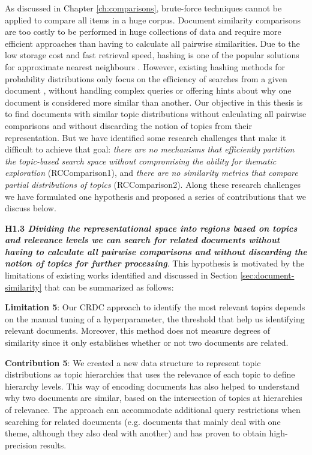 As discussed in Chapter \ref{ch:comparisons}, brute-force techniques cannot be applied to compare all items in a huge corpus. Document similarity comparisons are too costly to be performed in huge collections of data and require more efficient approaches than having to calculate all pairwise similarities. Due to the low storage cost and fast retrieval speed, hashing is one of the popular solutions for approximate nearest neighbours \citep{Zhen2016}. However, existing hashing methods for probability distributions only focus on the efficiency of searches from a given document \citep{Mao2017}, without handling complex queries or offering hints about why one document is considered more similar than another. Our objective in this thesis is to find documents with similar topic distributions without calculating all pairwise comparisons and without discarding the notion of topics from their representation. But we have identified some research challenges that make it difficult to achieve that goal: \textit{there are no mechanisms that efficiently partition the topic-based search space without compromising the ability for thematic exploration} (RCComparison1), and \textit{there are no similarity metrics that compare partial distributions of topics} (RCComparison2). Along these research challenges we have formulated one hypothesis and proposed a series of contributions that we discuss below.

\textbf{H1.3 \textit{Dividing the representational space into regions based on topics and relevance levels we can search for related documents without having to calculate all pairwise comparisons and without discarding the notion of topics for further processing}}. This hypothesis is motivated by the limitations of existing works identified and discussed in Section \ref{sec:document-similarity} that can be summarized as follows:


\textbf{Limitation 5}: Our CRDC approach to identify the most relevant topics depends on the manual tuning of a hyperparameter, the threshold that help us identifying relevant documents. Moreover, this method does not measure degrees of similarity since it only establishes whether or not two documents are related. 

\textbf{Contribution 5}: We created a new data structure to represent topic distributions as topic hierarchies that uses the relevance of each topic to define hierarchy levels. This way of encoding documents has also helped to understand why two documents are similar, based on the intersection of topics at hierarchies of relevance. The approach can accommodate additional query restrictions when searching for related documents (e.g. documents that mainly deal with one theme, although they also deal with another) and has proven to obtain high-precision results. 

